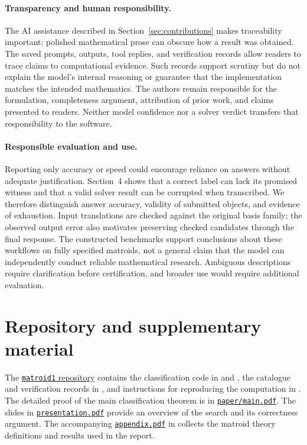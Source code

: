\documentclass[11pt,letterpaper,titlepage]{article}
\begin{document}
\paragraph{Transparency and human responsibility.}
The AI assistance described in Section~\ref{sec:contributions} makes traceability important: polished mathematical prose can obscure how a result was obtained. The saved prompts, outputs, tool replies, and verification records allow readers to trace claims to computational evidence. Such records support scrutiny but do not explain the model's internal reasoning or guarantee that the implementation matches the intended mathematics. The authors remain responsible for the formulation, completeness argument, attribution of prior work, and claims presented to readers. Neither model confidence nor a solver verdict transfers that responsibility to the software.

\paragraph{Responsible evaluation and use.}
Reporting only accuracy or speed could encourage reliance on answers without adequate justification. Section~4 shows that a correct label can lack its promised witness and that a valid solver result can be corrupted when transcribed. We therefore distinguish answer accuracy, validity of submitted objects, and evidence of exhaustion. Input translations are checked against the original basis family; the observed output error also motivates preserving checked candidates through the final response. The constructed benchmarks support conclusions about these workflows on fully specified matroids, not a general claim that the model can independently conduct reliable mathematical research. Ambiguous descriptions require clarification before certification, and broader use would require additional evaluation.



\section{Repository and supplementary material}

The \href{https://github.com/DengTianle/matroid1}{\texttt{matroid1} repository}
contains the classification code in  and ,
the catalogue and verification records in , and
instructions for reproducing the computation in .
The detailed proof of the main classification theorem is in
\href{../paper/main.pdf}{\texttt{paper/main.pdf}}.
The slides in \href{../presentation.pdf}{\texttt{presentation.pdf}} provide an
overview of the search and its correctness argument.
The accompanying \href{./appendix.pdf}{\texttt{appendix.pdf}} in
 collects the matroid theory definitions and results used in the
report.
\end{document}
